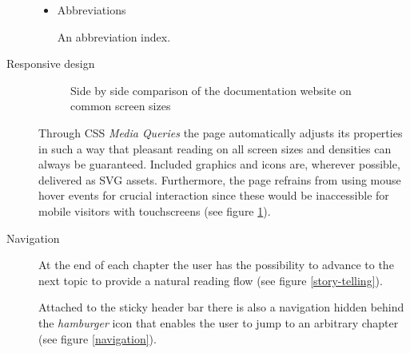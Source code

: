 \begin{description}
\begin{itemize}
		\item Abbreviations

		An abbreviation index.

	\end{itemize}

	\item[Responsive design]\hfill

	\begin{figure}[]
		\caption{Side by side comparison of the documentation website on common screen sizes}
		\label{responsive-design}
	\end{figure}

	Through \ac{CSS} \textit{Media Queries} the page automatically adjusts its properties in such a way that pleasant reading on all screen sizes and densities can always be guaranteed. Included graphics and icons are, wherever possible, delivered as \ac{SVG} assets. Furthermore, the page refrains from using mouse hover events for crucial interaction since these would be inaccessible for mobile visitors with touchscreens (see figure \ref{responsive-design}).

	\item[Navigation]\hfill

	At the end of each chapter the user has the possibility to advance to the next topic to provide a natural reading flow (see figure \ref{story-telling}).

	Attached to the sticky header bar there is also a navigation hidden behind the \textit{hamburger} icon that enables the user to jump to an arbitrary chapter (see figure \ref{navigation}).


\end{description}
